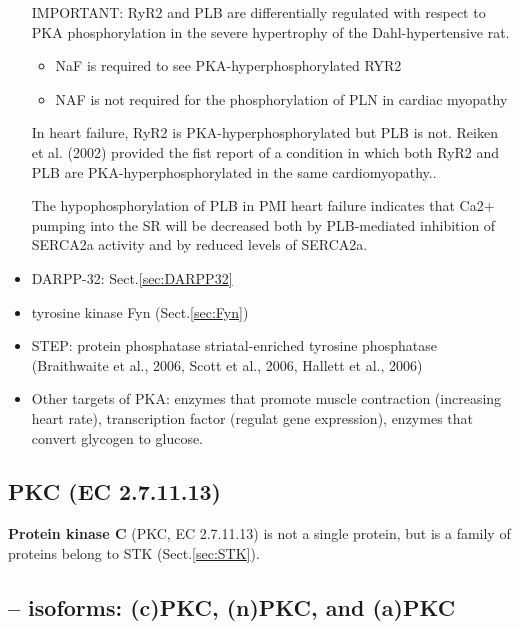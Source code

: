 \begin{itemize}
IMPORTANT: RyR2 and PLB are differentially regulated with respect to PKA
phosphorylation in the severe hypertrophy of the Dahl-hypertensive rat.
\begin{itemize}
  \item NaF is required to see PKA-hyperphosphorylated RYR2
  \item NAF is not required for the phosphorylation of PLN in cardiac myopathy
\end{itemize}
In heart failure, RyR2 is PKA-hyperphosphorylated but PLB is not. 
Reiken et al. (2002) provided the fist report of a condition in which both RyR2
and PLB are PKA-hyperphosphorylated in the same
cardiomyopathy.\citep{Reiken2002}.

The hypophosphorylation of PLB in PMI heart failure indicates that Ca2+ pumping
into the SR will be decreased both by PLB-mediated inhibition of SERCA2a
activity and by reduced levels of SERCA2a.



  \item  DARPP-32: Sect.\ref{sec:DARPP32}
  
  \item tyrosine kinase Fyn (Sect.\ref{sec:Fyn})

  \item STEP: protein phosphatase striatal-enriched tyrosine phosphatase
  (Braithwaite et al., 2006, Scott et al., 2006, Hallett et al., 2006)

  
  \item Other targets of PKA: enzymes that promote muscle contraction (increasing
  heart rate), transcription factor (regulat gene expression), enzymes that
  convert glycogen to glucose.

\end{itemize}



\subsection{PKC (EC 2.7.11.13)}
\label{sec:PKC}

{\bf Protein kinase C} (PKC, EC 2.7.11.13) is not a single protein, but is a
family of proteins belong to STK (Sect.\ref{sec:STK}).
  

\subsection{-- isoforms: (c)PKC, (n)PKC, and (a)PKC}
\label{sec:PKC-isoforms}

